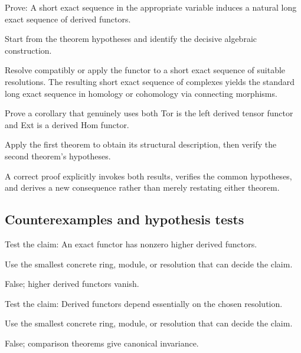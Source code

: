 \begin{exercise}\label{exr:v28-expand-08}
Prove: A short exact sequence in the appropriate variable induces a natural long exact sequence of derived functors.
\end{exercise}
\begin{hint}
Start from the theorem hypotheses and identify the decisive algebraic construction.
\end{hint}
\begin{solution}
Resolve compatibly or apply the functor to a short exact sequence of suitable resolutions. The resulting short exact sequence of complexes yields the standard long exact sequence in homology or cohomology via connecting morphisms.
\end{solution}

\begin{exercise}\label{exr:v28-expand-09}
Prove a corollary that genuinely uses both Tor is the left derived tensor functor and Ext is a derived Hom functor.
\end{exercise}
\begin{hint}
Apply the first theorem to obtain its structural description, then verify the second theorem's hypotheses.
\end{hint}
\begin{solution}
A correct proof explicitly invokes both results, verifies the common hypotheses, and derives a new consequence rather than merely restating either theorem.
\end{solution}

\subsection*{Counterexamples and hypothesis tests}

\begin{exercise}\label{exr:v28-expand-10}
Test the claim: An exact functor has nonzero higher derived functors.
\end{exercise}
\begin{hint}
Use the smallest concrete ring, module, or resolution that can decide the claim.
\end{hint}
\begin{solution}
False; higher derived functors vanish.
\end{solution}

\begin{exercise}\label{exr:v28-expand-11}
Test the claim: Derived functors depend essentially on the chosen resolution.
\end{exercise}
\begin{hint}
Use the smallest concrete ring, module, or resolution that can decide the claim.
\end{hint}
\begin{solution}
False; comparison theorems give canonical invariance.
\end{solution}

